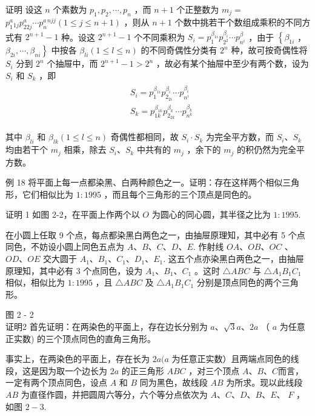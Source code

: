 \documentclass[10pt]{article}
\begin{document}
证明 设这 $n$ 个素数为 $p_{1}, p_{2}, \cdots, p_{n}$ ，而 $n+1$ 个正整数为 $m_{j}=$ $p_{1}^{a}{ }_{1 j} p_{22 j}^{a} \cdots p_{n}^{a}{ }^{n j j}(1 \leqslant j \leqslant n+1)$ ，则从 $n+1$ 个数中挑若干个数组成乘积的不同方式有 $2^{n+1}-1$ 种。设这 $2^{n+1}-1$ 个不同乘积为 $S_{i}=p_{1}^{\beta_{1 i}} p_{2^{2}}^{\beta_{i}} \cdots p_{n^{i}}^{\beta}$ ，由于 $\left\{\beta_{1 i}\right.$ ， $\left.\beta_{2 i}, \cdots, \beta_{n i}\right\}$ 中按各 $\beta_{l i}(1 \leqslant l \leqslant n)$ 的不同奇偶性分类有 $2^{n}$ 种，故可按奇偶性将 $S_{i}$ 分到 $2^{n}$ 个抽屉中，而 $2^{n+1}-1>2^{n}$ ，故必有某个抽屉中至少有两个数，设为 $S_{i}$ 和 $S_{k}$ ，即\\
\begin{align*}
\begin{aligned}
& S_{i}=p_{1}^{\beta_{1 i}} p_{2_{2 i}}^{\beta_{i}} \cdots p_{n^{i}}^{\beta_{i}} \\
& S_{k}=p_{1 k}^{\beta_{1 k}} p_{2_{2 k}}^{\beta_{k}} \cdots p_{n^{k}}^{\beta_{k}}
\end{aligned}
\end{align*}

其中 $\beta_{l i}$ 和 $\beta_{l k}(1 \leqslant l \leqslant n)$ 奇偶性都相同，故 $S_{i} \cdot S_{k}$ 为完全平方数，而 $S_{i} 、 S_{k}$ 均由若干个 $m_{j}$ 相乘，除去 $S_{i} 、 S_{k}$ 中共有的 $m_{j}$ ，余下的 $m_{j}$ 的积仍然为完全平方数。

例 18 将平面上每一点都染黑、白两种颜色之一。证明：存在这样两个相似三角形，它们相似比为 $1: 1995$ ，而且每个三角形的三个顶点是同色的。

证明 1 如图 2-2，在平面上作两个以 $O$ 为圆心的同心圆，其半径之比为 $1: 1995$.

在小圆上任取 9 个点，每点都染黑白两色之一，由抽屉原理知，其中必有 5 个点同色，不妨设小圆上同色五点为 $A 、 B 、 C 、 D 、 E$. 作射线 $O A 、 O B 、 O C$ 、 $O D 、 O E$ 交大圆于 $A_{1} 、 B_{1} 、 C_{1} 、 D_{1} 、 E_{1}$. 这五个点亦染黑白两色之一，由抽屉原理知，其中必有 3 个点同色，设为 $A_{1} 、 B_{1} 、 C_{1}$ 。这时 $\triangle A B C$ 与 $\triangle A_{1} B_{1} C_{1}$ 相似，相似比为 $1: 1995$ ，且 $\triangle A B C$ 及 $\triangle A_{1} B_{1} C_{1}$ 分别是顶点同色的两个三角形。

图 2 - 2\\
证明2 首先证明：在两染色的平面上，存在边长分别为 $a 、 \sqrt{3} a 、 2 a$ （ $a$ 为任意正实数) 的三个顶点同色的直角三角形。

事实上，在两染色的平面上，存在长为 $2 a(a$ 为任意正实数）且两端点同色的线段，这是因为取一个边长为 $2 a$ 的正三角形 $A B C$ ，对三个顶点 $A 、 B 、 C$而言，一定有两个顶点同色，设点 $A$ 和 $B$ 同为黑色，故线段 $A B$ 为所求。现以此线段 $A B$ 为直径作圆，并把圆周六等分，六个等分点依次为 $A 、 C 、 D 、 B 、 E 、$ $F$ ，如图 $2-3$.
\end{document}
